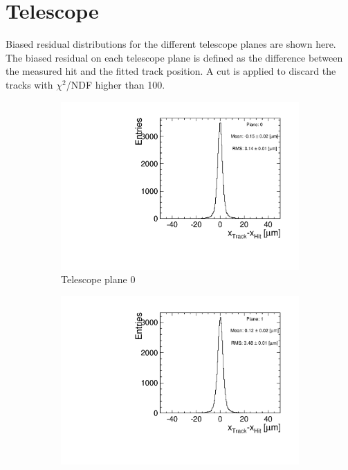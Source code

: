 \chapter{Telescope}
\label{sec:appendixTelescope}

Biased residual distributions for the different telescope planes are
shown here. The biased residual on each telescope plane is defined as
the difference between the measured hit and the fitted track
position. A cut is applied to discard the tracks with $\chi^2$/NDF
higher than 100.


\begin{figure}[htbp] \centering
  \begin{subfigure}[b]{0.3\textwidth}
    \includegraphics[width=\textwidth]{figures/Telescope/biasedResiduals/BiasedResiduals_run661_PlaneXRMS0.pdf}
    \caption{Telescope plane 0}
  \end{subfigure}\hfill
  \begin{subfigure}[b]{0.3\textwidth}
    \includegraphics[width=\textwidth]{figures/Telescope/biasedResiduals/BiasedResiduals_run661_PlaneXRMS1.pdf}

\end{subfigure}
\end{figure}
